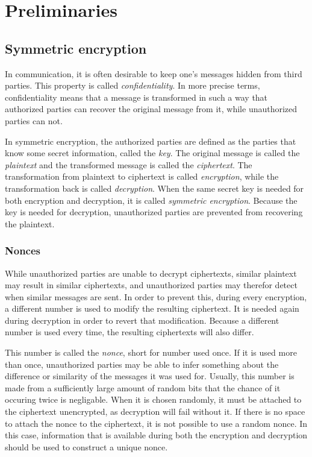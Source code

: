 \section{Preliminaries}

\subsection{Symmetric encryption}

In communication, it is often desirable to keep one's messages hidden from third
parties. This property is called \emph{confidentiality}. In more precise terms,
confidentiality means that a message is transformed in such a way that
authorized parties can recover the original message from it, while unauthorized
parties can not.

In symmetric encryption, the authorized parties are defined as
the parties that know some secret information, called the \emph{key}. The
original message is called the \emph{plaintext} and the transformed message is
called the \emph{ciphertext}. The transformation from plaintext to ciphertext is
called \emph{encryption}, while the transformation back is called
\emph{decryption}. When the same secret key is needed for both encryption and
decryption, it is called \emph{symmetric encryption}. Because the key is needed
for decryption, unauthorized parties are prevented from recovering the
plaintext.

\subsubsection{Nonces}

While unauthorized parties are unable to decrypt ciphertexts, similar plaintext
may result in similar ciphertexts, and unauthorized parties may therefor detect
when similar messages are sent. In order to prevent this, during every
encryption, a different number is used to modify the resulting ciphertext. It is
needed again during decryption in order to revert that modification. Because a
different number is used every time, the resulting ciphertexts will also differ.

This number is called the \emph{nonce}, short for number used once. If it is
used more than once, unauthorized parties may be able to infer something about
the difference or similarity of the messages it was used for. Usually, this
number is made from a sufficiently large amount of random bits that the chance
of it occuring twice is negligable. When it is chosen randomly, it must be
attached to the ciphertext unencrypted, as decryption will fail without it. If
there is no space to attach the nonce to the ciphertext, it is not possible to
use a random nonce. In this case, information that is available during both the
encryption and decryption should be used to construct a unique nonce.

